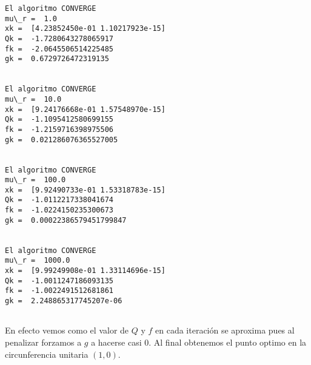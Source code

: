 \documentclass[11pt]{article}
\begin{document}
    \begin{Verbatim}[commandchars=\\\{\}]
El algoritmo CONVERGE
mu\_r =  1.0
xk =  [4.23852450e-01 1.10217923e-15]
Qk =  -1.7280643278065917
fk =  -2.0645506514225485
gk =  0.6729726472319135


El algoritmo CONVERGE
mu\_r =  10.0
xk =  [9.24176668e-01 1.57548970e-15]
Qk =  -1.1095412580699155
fk =  -1.2159716398975506
gk =  0.021286076365527005


El algoritmo CONVERGE
mu\_r =  100.0
xk =  [9.92490733e-01 1.53318783e-15]
Qk =  -1.0112217338041674
fk =  -1.0224150235300673
gk =  0.00022386579451799847


El algoritmo CONVERGE
mu\_r =  1000.0
xk =  [9.99249908e-01 1.33114696e-15]
Qk =  -1.0011247186093135
fk =  -1.0022491512681861
gk =  2.248865317745207e-06


    \end{Verbatim}

    En efecto vemos como el valor de \(Q\) y \(f\) en cada iteración se
aproxima pues al penalizar forzamos a \(g\) a hacerse casi \(0\). Al
final obtenemos el punto optimo en la circunferencia unitaria \((1,0)\).


    
    
    
\end{document}
